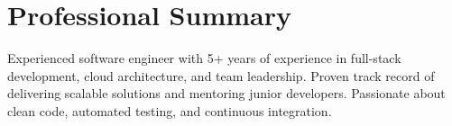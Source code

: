 \section{Professional Summary}
Experienced software engineer with 5+ years of experience in full-stack development, cloud architecture, and team leadership. Proven track record of delivering scalable solutions and mentoring junior developers. Passionate about clean code, automated testing, and continuous integration.
